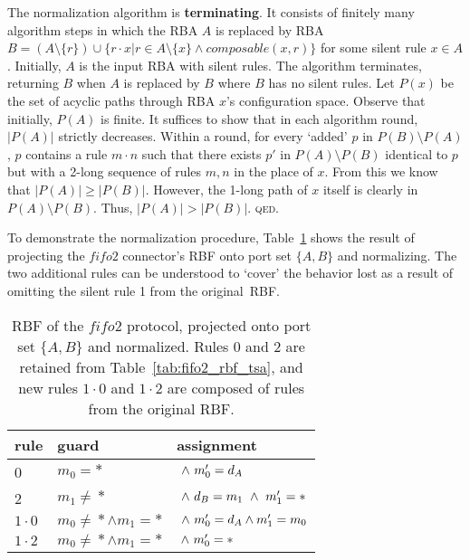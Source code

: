 The normalization algorithm is \textbf{terminating}. It consists of finitely many algorithm steps in which the RBA $A$ is replaced by RBA $B=(A \setminus{}\{r\}) \cup{} \{r\cdot{}x | r\in{} A\setminus{}\{x\} \wedge{} composable(x,r)\}$ for some silent rule $x \in{} A$. Initially, $A$ is the input RBA with silent rules. The algorithm terminates, returning $B$ when $A$ is replaced by $B$ where $B$ has no silent rules. Let $P(x)$ be the set of acyclic paths through RBA $x$'s configuration space. Observe that initially, $P(A)$ is finite. It suffices to show that in each algorithm round, $|P(A)|$ strictly decreases. Within a round, for every `added' $p$ in $P(B)\setminus{}P(A)$, $p$ contains a rule $m\cdot{}n$ such that there exists $p'$ in $P(A)\setminus{}P(B)$ identical to $p$ but with a 2-long sequence of rules $m, n$ in the place of $x$. From this we know that $|P(A)| \geq |P(B)|$. However, the 1-long path of $x$ itself is clearly in $P(A)\setminus{} P(B)$. Thus, $|P(A)| > |P(B)|$. \textsc{qed}.

To demonstrate the normalization procedure, Table~\ref{tab:fifo2_rbf_tsa_norm} shows the result of projecting the $fifo2$ connector's RBF onto port set $\{A,B\}$ and normalizing. The two additional rules can be understood to `cover' the behavior lost as a result of omitting the silent rule 1 from the original~RBF.


\begin{table}
	\centering
	\begin{tabular}{l|ll|}
		rule & guard & assignment \\
		\hline
		0 & $m_0=*$ & $\ \wedge{}\ {}m_0'=d_A$\\
		2 & $m_1\neq{}*$ & $\ \wedge{}\ {}d_B=m_1\ \wedge{}\ {}m_1'=*$ \\
		\hline
		$1\cdot{}0$ & $m_0\neq{}*\wedge{}m_1=*$ & $\ \wedge{}\ {}m_0'=d_A\wedge{}m_1'=m_0$ \\
		$1\cdot{}2$ & $m_0\neq{}*\wedge{}m_1=*$ & $\ \wedge{}\ {}m_0'=*$ \\
		\hline
	\end{tabular}
	\caption[RBF of fifo2 connector, projected and normalized.]{RBF of the $fifo2$ protocol, projected onto port set $\{A,B\}$ and normalized. Rules 0 and 2 are retained from Table~\ref{tab:fifo2_rbf_tsa}, and new rules $1\cdot{}0$ and $1\cdot{}2$ are composed of rules from the original RBF.}
	\label{tab:fifo2_rbf_tsa_norm}
\end{table}


